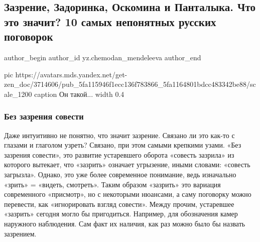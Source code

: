  
 
 
 
 
 
\subsection{Зазрение, Задоринка, Оскомина и Панталыка. Что это значит? 10 самых непонятных русских поговорок}
\label{sec:03_11_2020.sites.ru.zen_yandex.yz.chemodan_mendeleeva.1.jazyk_pogovorki}
\ifcmt
	author_begin
   author_id yz.chemodan_mendeleeva
	author_end
\fi
{}

\ifcmt
  pic https://avatars.mds.yandex.net/get-zen_doc/3714606/pub_5fa115946f1ecc136f783866_5fa1164801bdcc483342be88/scale_1200
	caption Он такой...
  width 0.4
\fi

\subsubsection{Без зазрения совести}

Даже интуитивно не понятно, что значит зазрение. Связано ли это как-то с
глазами и глаголом узреть? Связано, при этом самыми крепкими узами. «Без
зазрения совести», это развитие устаревшего оборота «совесть зазрила» из
которого вытекает, что «зазрить» означает угрызение, иными словами: «совесть
загрызла». Однако, это уже более современное понимание, ведь изначально «зрить»
= «видеть, смотреть». Таким образом «зазрить» это вариация современного
«присмотр», но с некоторыми нюансами, а саму поговорку можно перевести, как
«игнорировать взгляд совести». Между прочим, устаревшее «зазрить» сегодня могло
бы пригодиться. Например, для обозначения камер наружного наблюдения. Сам факт
их наличия, как раз можно было бы назвать зазрением.

